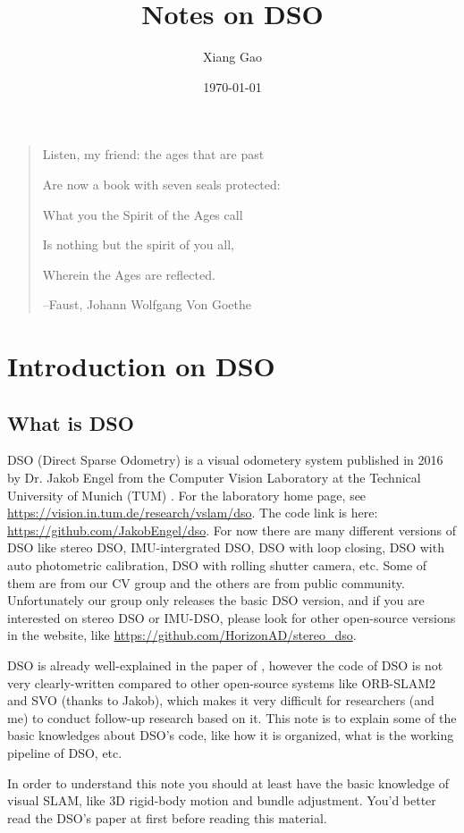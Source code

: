 \documentclass[a4paper,10pt]{article}
\title{Notes on DSO}
\author{Xiang Gao}
\date{\today}
\begin{document}
	\maketitle
	
	\begin{quotation}
		\centering
		Listen, my friend: the ages that are past
		
		Are now a book with seven seals protected:
		
		What you the Spirit of the Ages call
		
		Is nothing but the spirit of you all,
		
		Wherein the Ages are reflected.
		
		--Faust, Johann Wolfgang Von Goethe
	\end{quotation}
	
	\section{Introduction on DSO}
	\subsection{What is DSO}
	DSO (Direct Sparse Odometry) is a visual odometery system published in 2016 by Dr. Jakob Engel from the Computer Vision Laboratory at the Technical University of Munich (TUM) \cite{engel2017direct}. For the laboratory home page, see \url{https://vision.in.tum.de/research/vslam/dso}. The code link is here: \url{https://github.com/JakobEngel/dso}. For now there are many different versions of DSO like stereo DSO, IMU-intergrated DSO, DSO with loop closing, DSO with auto photometric calibration, DSO with rolling shutter camera, etc. Some of them are from our CV group and the others are from public community. Unfortunately our group only releases the basic DSO version, and if you are interested on stereo DSO or IMU-DSO, please look for other open-source versions in the website, like \url{https://github.com/HorizonAD/stereo_dso}. 

	DSO is already well-explained in the paper of \cite{engel2017direct}, however the code of DSO is not very clearly-written compared to other open-source systems like ORB-SLAM2 and SVO (thanks to Jakob), which makes it very  difficult for researchers (and me) to conduct follow-up research based on it. This note is to explain some of the basic knowledges about DSO's code, like how it is organized, what is the working pipeline of DSO, etc. 
	
	In order to understand this note you should at least have the basic knowledge of visual SLAM, like 3D rigid-body motion and bundle adjustment. You'd better read the DSO's paper at first before reading this material.
	
\end{document}
